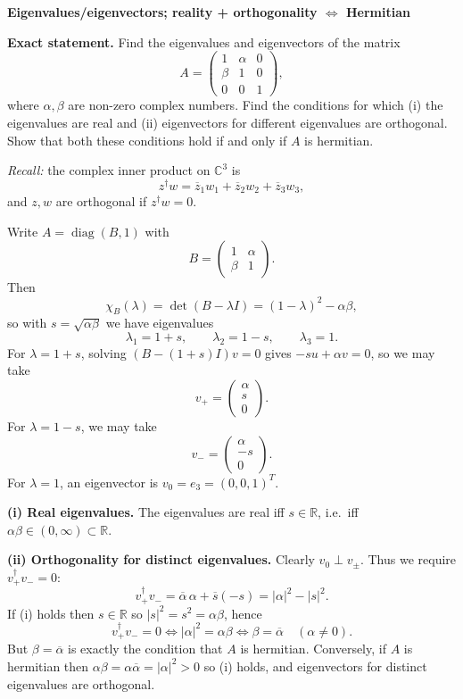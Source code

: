 \begin{problem}[CP-I-0117]
\label{prob:cp-i-0117}
\textbf{Eigenvalues/eigenvectors; reality + orthogonality \(\Leftrightarrow\) Hermitian}

\textbf{Exact statement.}
\hspace*{1.5em}Find the eigenvalues and eigenvectors of the matrix
\[
A=\begin{pmatrix}
	1&\alpha&0\\
	\beta&1&0\\
	0&0&1
\end{pmatrix},
\]
where \(\alpha,\beta\) are non-zero complex numbers. Find the conditions for which
(i) the eigenvalues are real and
(ii) eigenvectors for different eigenvalues are orthogonal.
Show that both these conditions hold if and only if \(A\) is hermitian.

\emph{Recall:} the complex inner product on \(\mathbb C^3\) is
\[
z^\dagger w=\overline z_1 w_1+\overline z_2 w_2+\overline z_3 w_3,
\]
and \(z,w\) are orthogonal if \(z^\dagger w=0\).

\end{problem}

\begin{solution}
Write \(A=\operatorname{diag}(B,1)\) with
\[
B=\begin{pmatrix}1&\alpha\\ \beta&1\end{pmatrix}.
\]
Then
\[
\chi_B(\lambda)=\det(B-\lambda I)=(1-\lambda)^2-\alpha\beta,
\]
so with \(s=\sqrt{\alpha\beta}\) we have eigenvalues
\[
\lambda_1=1+s,\qquad \lambda_2=1-s,\qquad \lambda_3=1.
\]
For \(\lambda=1+s\), solving \((B-(1+s)I)v=0\) gives \(-su+\alpha v=0\), so we may take
\[
v_+=\begin{pmatrix}\alpha\\ s\\ 0\end{pmatrix}.
\]
For \(\lambda=1-s\), we may take
\[
v_-=\begin{pmatrix}\alpha\\ -s\\ 0\end{pmatrix}.
\]
For \(\lambda=1\), an eigenvector is \(v_0=e_3=(0,0,1)^T\).

\textbf{(i) Real eigenvalues.}
The eigenvalues are real iff \(s\in\mathbb R\), i.e.\ iff \(\alpha\beta\in(0,\infty)\subset\mathbb R\).

\textbf{(ii) Orthogonality for distinct eigenvalues.}
Clearly \(v_0\perp v_\pm\). Thus we require \(v_+^\dagger v_-=0\):
\[
v_+^\dagger v_-=\overline\alpha\,\alpha+\overline s(-s)=|\alpha|^2-|s|^2.
\]
If (i) holds then \(s\in\mathbb R\) so \(|s|^2=s^2=\alpha\beta\), hence
\[
v_+^\dagger v_-=0 \iff |\alpha|^2=\alpha\beta \iff \beta=\overline\alpha \quad(\alpha\neq 0).
\]
But \(\beta=\overline\alpha\) is exactly the condition that \(A\) is hermitian. Conversely, if \(A\) is hermitian then
\(\alpha\beta=\alpha\overline\alpha=|\alpha|^2>0\) so (i) holds, and eigenvectors for distinct eigenvalues are orthogonal.
\end{solution}

